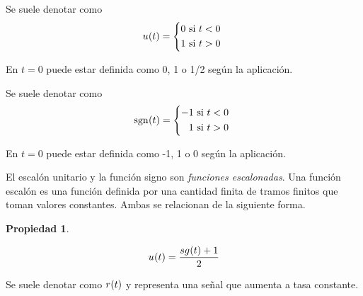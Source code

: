 \documentclass[a5paper,12pt,twoside]{book}
\newtheorem{prop}{{Propiedad}}[chapter]
\begin{document}

Se suele denotar como
\begin{equation*}
    \fx[u]{t} =
    \left\{
    \begin{aligned}
        0 \text{ si $t<0$ }
        \\
        1 \text{ si $t>0$ }
    \end{aligned}
    \right.
\end{equation*}

En $t=0$ puede estar definida como 0, 1 o 1/2 según la aplicación.

\begin{center}
    \def\svgwidth{0.6\linewidth}
    
\end{center}


Se suele denotar como
\begin{equation*}
    \fx[\sgn]{t} =
    \left\{
    \begin{aligned}
        -1 \text{ si $t<0$ }
        \\
        1 \text{ si $t>0$ }
    \end{aligned}
    \right.
\end{equation*} 

En $t=0$ puede estar definida como -1, 1 o 0 según la aplicación.

\begin{center}
    \def\svgwidth{0.6\linewidth}
    
\end{center}

El escalón unitario y la función signo son \emph{funciones escalonadas}. Una función escalón es una función definida por una cantidad finita de tramos finitos que toman valores constantes. Ambas se relacionan de la siguiente forma.

\begin{mdframed}[style=MyFrame1]
    \begin{prop}
    \end{prop}
    \begin{equation*}
        \fx[u]{t} = \frac{\fx[sg]{t} + 1}{2}
    \end{equation*}
\end{mdframed}


Se suele denotar como $\fx[r]{t}$ y representa una señal que aumenta a tasa constante.

\begin{center}
    \def\svgwidth{0.6\linewidth}
    
\end{center}
\end{document}
